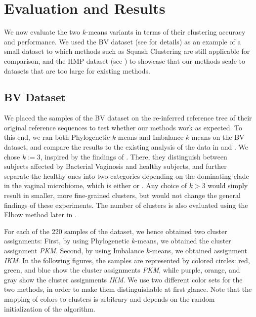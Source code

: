 \section{Evaluation and Results}
\label{ch:Clustering:sec:Results}

We now evaluate the two $k$-means variants in terms of their clustering accuracy and performance.
We used the \acf{BV} dataset (see  for details)
as an example of a small dataset to which methods such as Squash Clustering \cite{Matsen2011a}
are still applicable for comparison,
and the \acf{HMP} dataset (see )
to showcase that our methods scale to datasets that are too large for existing methods.


\subsection{BV Dataset}
\label{ch:Clustering:sec:Results:sub:BVDataset}

We placed the samples of the \ac{BV} dataset \cite{Srinivasan2012}
on the re-inferred reference tree of their original reference sequences
to test whether our methods work as expected.
To this end, we ran both Phylogenetic $k$-means and Imbalance $k$-means on the \ac{BV} dataset,
and compare the results to the existing analysis of the data in \cite{Srinivasan2012} and \cite{Matsen2011a}.
We chose $k:=3$, inspired by the findings of \cite{Srinivasan2012}.
There, they distinguish between subjects affected by Bacterial Vaginosis and healthy subjects,
and further separate the healthy ones into two categories depending on the dominating clade in the vaginal microbiome,
which is either  or .
Any choice of $k > 3$ would simply result in smaller, more fine-grained clusters,
but would not change the general findings of these experiments.
The number of clusters is also evaluated using the Elbow method later in .

For each of the \num{220} samples of the dataset, we hence obtained two cluster assignments:
First, by using Phylogenetic $k$-means, we obtained the cluster assignment \emph{PKM}.
Second, by using Imbalance $k$-means, we obtained assignment \emph{IKM}.
In the following figures, the samples are represented by colored circles:
red, green, and blue show the cluster assignments \emph{PKM},
while purple, orange, and gray show the cluster assignments \emph{IKM}.
We use two different color sets for the two methods, in order to make them distinguishable at first glance.
Note that the mapping of colors to clusters is arbitrary and depends on the random initialization of the algorithm.

